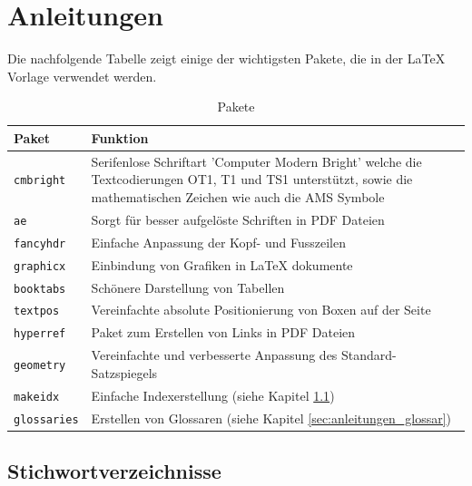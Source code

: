 \chapter{Anleitungen}
\label{chap:anleitungen}

Die nachfolgende Tabelle zeigt einige der wichtigsten Pakete, die in der \LaTeX{} Vorlage verwendet werden.

\begin{table}[H]
	\centering
		\begin{tabular}{p{} p{}} \toprule
			\textbf{Paket} & \textbf{Funktion} \\ \midrule
			\texttt{cmbright}\index{cmbright} & Serifenlose Schriftart 'Computer Modern Bright' welche die Textcodierungen\index{Textcodierungen} OT1, T1 und TS1 unterstützt, sowie die mathematischen Zeichen wie auch die AMS Symbole \\ \midrule
			\texttt{ae} & Sorgt für besser aufgelöste Schriften in PDF Dateien \\ \midrule
			\texttt{fancyhdr}\index{fancyhdr} & Einfache Anpassung der Kopf- und Fusszeilen \\ \midrule
			\texttt{graphicx}\index{graphicx} & Einbindung von Grafiken in \LaTeX{} dokumente \\ \midrule
			\texttt{booktabs}\index{booktabs} & Schönere Darstellung von Tabellen \\ \midrule
			\texttt{textpos}\index{textpos} & Vereinfachte absolute Positionierung von Boxen auf der Seite \\ \midrule
			\texttt{hyperref}\index{hyperref} & Paket zum Erstellen von Links in PDF Dateien \\ \midrule
			\texttt{geometry}\index{geometry} & Vereinfachte und verbesserte Anpassung des Standard-Satzspiegels \\ \midrule
			\texttt{makeidx}\index{makeidx} & Einfache Indexerstellung (siehe Kapitel \ref{sec:anleitungen_index})\\ \midrule
			\texttt{glossaries}\index{glossaries} & Erstellen von Glossaren (siehe Kapitel \ref{sec:anleitungen_glossar}) \\ \bottomrule
		\end{tabular}
	\caption{Pakete}
	\label{tab:pakete}
\end{table}


\section{Stichwortverzeichnisse}
\label{sec:anleitungen_index}

